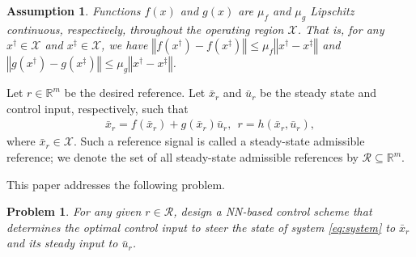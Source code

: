 \documentclass[1p,times]{elsarticle}
\newtheorem{problem}{Problem}
\newtheorem{assumption}{Assumption}
\begin{document}
\begin{assumption}\label{assumption:Lipchitz2}
Functions $f(x)$ and $g(x)$ are $\mu_f$ and $\mu_g$ Lipschitz continuous, respectively, throughout the operating region $\mathcal{X}$. That is, for any $x^\dag\in\mathcal{X}$ and $x^\ddag\in\mathcal{X}$, we have $\left\Vert f(x^\dag)-f(x^\ddag)\right\Vert\leq\mu_f\left\Vert x^\dag-x^\ddag\right\Vert$ and $\left\Vert g(x^\dag)-g(x^\ddag)\right\Vert\leq\mu_g\left\Vert x^\dag-x^\ddag\right\Vert$.
\end{assumption}


Let $r \in \mathbb{R}^m$ be the desired reference. Let $\bar{x}_r$ and $\bar{u}_r$ be the steady state and control input, respectively, such that
\begin{align}\label{eq:SSconfiguration}
\bar{x}_r=f\left(\bar{x}_r\right)+g\left(\bar{x}_r\right)\bar{u}_r,~~r=h\left(\bar{x}_r,\bar{u}_r\right),
\end{align}
where $\bar{x}_r\in\mathcal{X}$. Such a reference signal is called a steady-state admissible reference; we denote the set of all steady-state admissible references by $\mathcal{R}\subseteq\mathbb{R}^m$.


This paper addresses the following problem.
\begin{problem}\label{Problem}
For any given $r\in\mathcal{R}$, design a NN-based control scheme that determines the optimal control input to steer the state of system \eqref{eq:system} to $\bar{x}_r$ and its steady input to $\bar{u}_r$. 
\end{problem}





\end{document}
